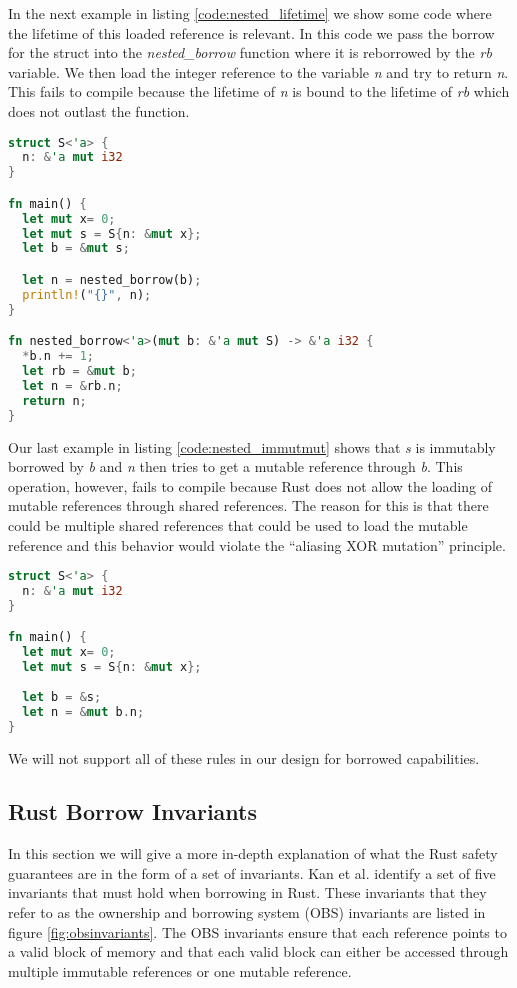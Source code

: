In the next example in listing \ref{code:nested_lifetime} we show some code where the lifetime of this loaded reference is relevant.
In this code we pass the borrow for the struct into the \textit{nested\_borrow} function where it is reborrowed by the \textit{rb} variable.
We then load the integer reference to the variable \textit{n} and try to return \textit{n}.
This fails to compile because the lifetime of \textit{n} is bound to the lifetime of \textit{rb} which does not outlast the function.

\begin{lstlisting}[language=Rust,frame=single,caption=Reborrow Example,label=code:nested_lifetime]
struct S<'a> {
  n: &'a mut i32
}

fn main() {
  let mut x= 0;
  let mut s = S{n: &mut x};
  let b = &mut s;

  let n = nested_borrow(b);
  println!("{}", n);
}

fn nested_borrow<'a>(mut b: &'a mut S) -> &'a i32 {
  *b.n += 1;
  let rb = &mut b;
  let n = &rb.n;
  return n;
}
\end{lstlisting}

Our last example in listing \ref{code:nested_immutmut} shows that \textit{s} is immutably borrowed by \textit{b} and \textit{n} then tries to get a mutable reference through \textit{b}.
This operation, however, fails to compile because Rust does not allow the loading of mutable references through shared references.
The reason for this is that there could be multiple shared references that could be used to load the mutable reference and this behavior would violate the ``aliasing XOR mutation'' principle.
\begin{lstlisting}[language=Rust,frame=single,caption=Mutable reference through shared borrow,label=code:nested_immutmut]
struct S<'a> {
  n: &'a mut i32
}

fn main() {
  let mut x= 0;
  let mut s = S{n: &mut x};
    
  let b = &s;
  let n = &mut b.n;
}
\end{lstlisting}

We will not support all of these rules in our design for borrowed capabilities.

\subsection{Rust Borrow Invariants}
\label{sec:obsinvariants}
In this section we will give a more in-depth explanation of what the Rust safety guarantees are in the form of a set of invariants.
Kan et al. \cite{Kan2018AnEO} identify a set of five invariants that must hold when borrowing in Rust.
These invariants that they refer to as the ownership and borrowing system (OBS) invariants are listed in figure \ref{fig:obsinvariants}.
The OBS invariants ensure that each reference points to a valid block of memory and that each valid block can either be accessed through multiple immutable references or one mutable reference.

